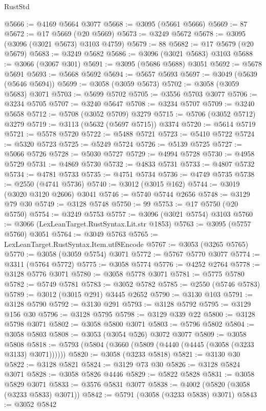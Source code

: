 \begin{lexlean}{RustStd}
\begin{coremodule}
{\begin{coremodule}
{{{{{{{{{{{{{{{{{{{{{{{{{{{{{{{{@5666 := @4169 @5664 @3077
@5668 := @3095 (@5661 @5666)
@5669 := 87
@5672 := @17 @5669 (@20 @5669)
@5673 := @3249 @5672
@5678 := @3095 (@3096 (@3021 @5673) @3103 @4759)
@5679 := 88
@5682 := @17 @5679 (@20 @5679)
@5683 := @3249 @5682
@5686 := @3096 (@3021 @5683) @3103
@5688 := @3066 (@3067 @301)
@5691 := @3095 (@5686 @5688) @3051
@5692 := @5678 @5691
@5693 := @5668 @5692
@5694 := @5657 @5693
@5697 := @3049 (@5639 (@5646 @5694))
@5699 := @3058 (@3059 @5673)
@5702 := @3058 (@3059 @5683) @3071
@5703 := @5699 @5702
@5705 := @3556 @5703 @3077
@5706 := @3234 @5705
@5707 := @3240 @5647
@5708 := @3234 @5707
@5709 := @3240 @5658
@5712 := @5708 (@3052 @5709) @3279
@5715 := @5706 (@3052 @5712) @3279
@5719 := @3113 (@5632 (@5697 @5715)) @3374
@5720 := @5614 @5719
@5721 := @5578 @5720
@5722 := @5488 @5721
@5723 := @5410 @5722
@5724 := @5320 @5723
@5725 := @5249 @5724
@5726 := @5139 @5725
@5727 := @5066 @5726
@5728 := @5030 @5727
@5729 := @4994 @5728
@5730 := @4958 @5729
@5731 := @4869 @5730
@5732 := @4833 @5731
@5733 := @4807 @5732
@5734 := @4781 @5733
@5735 := @4751 @5734
@5736 := @4749 @5735
@5738 := @2550 (@4741 @5736)
@5740 := @3012 (@3015 @162)
@5744 := @3019 (@3020 @3120 @2606) @3041
@5746 := @5740 @5744 @2656
@5748 := @3129 @79 @30
@5749 := @3128 @5748
@5750 := 99
@5753 := @17 @5750 (@20 @5750)
@5754 := @3249 @5753
@5757 := @3096 (@3021 @5754) @3103
@5760 := @3066 (LexLeanTarget.RustSyntax.Lit.str @1853)
@5763 := @3095 (@5757 @5760) @3051
@5764 := @3049 @5763
@5765 := LexLeanTarget.RustSyntax.Item.utf8Encode
@5767 := @3053 (@3265 @5765)
@5770 := @3058 (@3059 @5754) @3071
@5772 := @5767 @5770 @3077
@5774 := @3311 (@5764 @5772)
@5775 := @3058 @5774
@5776 := @4252 @2764
@5778 := @3128 @5776 @3071
@5780 := @3058 @5778 @3071
@5781 := @5775 @5780
@5782 := @5749 @5781
@5783 := @3052 @5782
@5785 := @2550 (@5746 @5783)
@5789 := @3012 (@3015 @291) @3445 @2652
@5790 := @3130 @103
@5791 := @3128 @5790
@5792 := @3130 @291
@5793 := @3128 @5792
@5795 := @3129 @156 @30
@5796 := @3128 @5795
@5798 := @3129 @339 @22
@5800 := @3128 @5798 @3071
@5802 := @3058 @5800 @3071
@5803 := @5796 @5802
@5804 := @3058 @5803
@5808 := @3053 (@3054 @526) @3072 @3077
@5809 := @3058 @5808
@5818 := @5793 (@5804 (@3660 (@5809 (@4440 (@4445 (@3058 (@3233 @3133) @3071))))))
@5820 := @3058 (@3233 @5818)
@5821 := @3130 @30
@5822 := @3128 @5821
@5824 := @3129 @73 @30
@5826 := @3128 @5824 @3071
@5828 := @3058 @5826 @4446
@5829 := @5822 @5828
@5831 := @3058 @5829 @3071
@5833 := @3576 @5831 @3077
@5838 := @4002 (@5820 (@3058 (@3233 @5833) @3071))
@5842 := @5791 (@3058 (@3233 @5838) @3071)
@5843 := @3052 @5842
}}}}}}}}}}}}}}}}}}}}}}}}}}}}}}}}
\end{coremodule}}
\end{coremodule}
\end{lexlean}

